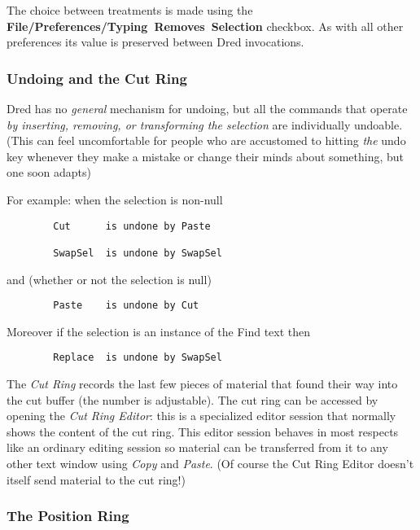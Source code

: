 \documentclass[
]{article}
\begin{document}
The choice between treatments is made using the
\textbf{File/Preferences/Typing~Removes~Selection} checkbox. As with all
other preferences its value is preserved between Dred invocations.

\hypertarget{undoing-and-the-cut-ring}{%
\subsubsection{Undoing and the Cut
Ring}\label{undoing-and-the-cut-ring}}

Dred has no \emph{general} mechanism for undoing, but all the commands
that operate \emph{by inserting, removing, or transforming the
selection} are individually undoable. (This can feel uncomfortable for
people who are accustomed to hitting \emph{the} undo key whenever they
make a mistake or change their minds about something, but one soon
adapts)

For example: when the selection is non-null

\begin{verbatim}
        Cut      is undone by Paste 
                
        SwapSel  is undone by SwapSel
\end{verbatim}

and (whether or not the selection is null)

\begin{verbatim}
        Paste    is undone by Cut 
\end{verbatim}

Moreover if the selection is an instance of the Find text then

\begin{verbatim}
        Replace  is undone by SwapSel
\end{verbatim}

The \emph{Cut Ring} records the last few pieces of material that found
their way into the cut buffer (the number is adjustable). The cut ring
can be accessed by opening the \emph{Cut Ring Editor}: this is a
specialized editor session that normally shows the content of the cut
ring. This editor session behaves in most respects like an ordinary
editing session so material can be transferred from it to any other text
window using \emph{Copy} and \emph{Paste}. (Of course the Cut Ring
Editor doesn't itself send material to the cut ring!)

\hypertarget{the-position-ring}{%
\subsubsection{The Position Ring}\label{the-position-ring}}
\end{document}
